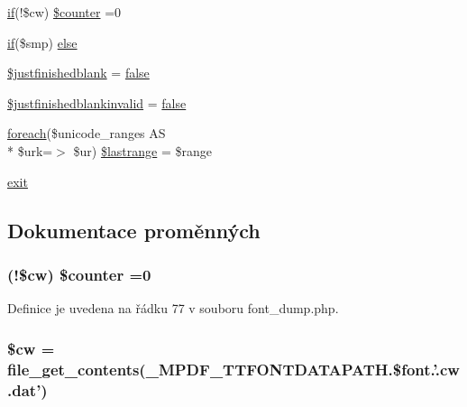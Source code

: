 \begin{DoxyCompactItemize}
\hyperlink{pdf__parser_8php_af8105e84b42a9ceda5357caeb6c4760b}{if}(!\$cw) \hyperlink{font__dump_8php_a35dd73275e7e365f793275450f261be0}{\$counter} =0
\item 
\hyperlink{pdf__parser_8php_af8105e84b42a9ceda5357caeb6c4760b}{if}(\$smp) \hyperlink{font__dump_8php_aa378ca8ac707e59c3887cf4c96cc1724}{else}
\item 
\hyperlink{font__dump_8php_a5cf1d6910240e03965be9beb01aae219}{\$justfinishedblank} = \hyperlink{ttfontsuni_8php_afbaa04e5cc97693dc668b3c45d3dd740}{false}
\item 
\hyperlink{font__dump_8php_a848c618c4ef3de2f7f7b61b6443fcf41}{\$justfinishedblankinvalid} = \hyperlink{ttfontsuni_8php_afbaa04e5cc97693dc668b3c45d3dd740}{false}
\item 
\hyperlink{font__names_8php_ac6e05d8eea8274a71f8f9c686e891421}{foreach}(\$unicode\-\_\-ranges A\-S \\*
\$urk=$>$ \$ur) \hyperlink{font__dump_8php_a62810da74f01f626696ab25d73e9ec48}{\$lastrange} = \$range
\item 
\hyperlink{font__dump_8php_a6733eb5f605d09eaede9845835d71c4e}{exit}
\end{DoxyCompactItemize}


\subsection{Dokumentace proměnných}
\hypertarget{font__dump_8php_a35dd73275e7e365f793275450f261be0}{
\subsubsection[{\$counter}]{ (!\$cw) \$counter =0}}\label{font__dump_8php_a35dd73275e7e365f793275450f261be0}


Definice je uvedena na řádku 77 v souboru font\-\_\-dump.\-php.

\hypertarget{font__dump_8php_ac2951b03dbb0317e6c61ec920b7479dc}{
\subsubsection[{\$cw}]{\setlength{\rightskip}{0pt plus 5cm}\$cw = file\-\_\-get\-\_\-contents(\-\_\-\-M\-P\-D\-F\-\_\-\-T\-T\-F\-O\-N\-T\-D\-A\-T\-A\-P\-A\-T\-H.\$font.'.cw.\-dat')}}\label{font__dump_8php_ac2951b03dbb0317e6c61ec920b7479dc}



